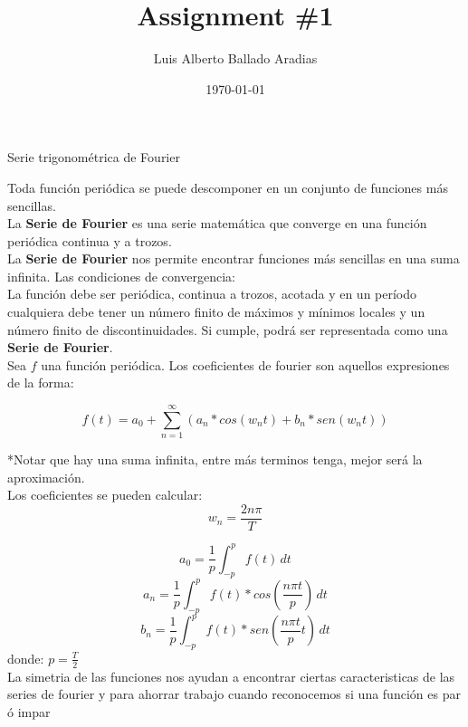 \documentclass[
	12pt, %
]{fphw}
\title{Assignment \#1} %
\author{Luis Alberto Ballado Aradias} %
\date{\today} %
\institute{Centro de Investigación y de Estudios Avanzados del IPN \\ Unidad Tamaulipas} %
\begin{document}
\maketitle %


{\color{teal}
\dotfill
Serie trigonométrica de Fourier
\dotfill}

Toda función periódica se puede descomponer en un conjunto de funciones más sencillas.\\

La \textbf{Serie de Fourier} es una serie matemática que converge en una función periódica continua y a trozos. \\

La \textbf{Serie de Fourier} nos permite encontrar funciones más sencillas en una suma infinita. Las condiciones de convergencia:\\

La función debe ser periódica, continua a trozos, acotada y en un período cualquiera debe tener un número finito de máximos y mínimos locales y un número finito de discontinuidades. Si cumple, podrá ser representada como una \textbf{Serie de Fourier}.\\

Sea $f$ una función periódica. Los coeficientes de fourier son aquellos expresiones de la forma:

\[ f(t) = a_{0} + \sum_{n=1} ^{\infty} (a_n*cos(w_{n}t) + b_{n}*sen(w_{n}t)) \]

*Notar que hay una suma infinita, entre más terminos tenga, mejor será la aproximación.\\

Los coeficientes se pueden calcular:\\

\[w_{n}=\frac{2n\pi}{T}\]

\[a_{0}=\frac{1}{p}\int_{-p}^{p} f(t) \,dt \]
\[a_{n}=\frac{1}{p}\int_{-p}^{p} f(t)*cos(\frac{n \pi t}{p}) \,dt \]
\[b_{n}=\frac{1}{p}\int_{-p}^{p} f(t)*sen(\frac{n \pi t}{p}t) \,dt \]
donde: $p=\frac{T}{2}$\\
\newpage
La simetria de las funciones nos ayudan a encontrar ciertas caracteristicas de las series de fourier y para ahorrar trabajo cuando reconocemos si una función es par ó impar \\
\end{document}
